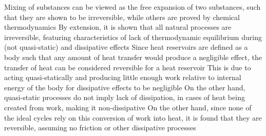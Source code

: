 \documentclass[11 pt, twoside]{article}
\newenvironment{outline*}
{
	\begin{outline}[enumerate]
	}
	{\end{outline}
}
\begin{document}
\begin{outline*}
\3 Mixing of substances can be viewed as the free expansion of two substances, such that they are shown to be irreversible, while others are proved by chemical thermodynamics
\2 By extension, it is shown that all natural processes are irreversible, featuring characteristics of lack of thermodynamic equilibrium during (not quasi-static) and dissipative effects
\3 Since heat reservoirs are defined as a body such that any amount of heat transfer would produce a negligible effect, the transfer of heat can be considered reversible for a heat reservoir
\4 This is due to acting quasi-statically and producing little enough work relative to internal energy of the body for dissipative effects to be negligible
\3 On the other hand, quasi-static processes do not imply lack of dissipation, in cases of heat being created from work, making it non-dissipative
\3 On the other hand, since none of the ideal cycles rely on this conversion of work into heat, it is found that they are reversible, assuming no friction or other dissipative processes
\end{outline*}
\end{document}
